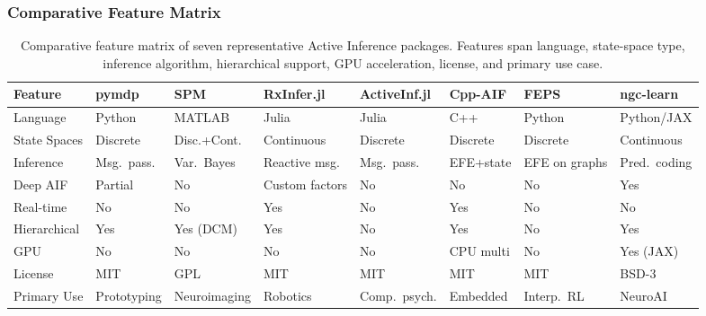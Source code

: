 \documentclass[
  english,
]{article}
\begin{document}
{{{{{{{{{{{{{{{{\FloatBarrier

\subsubsection{Comparative Feature
Matrix}\label{comparative-feature-matrix}

\begin{table}[H]
\centering
\caption{Comparative feature matrix of seven representative Active Inference packages. Features span language, state-space type, inference algorithm, hierarchical support, GPU acceleration, license, and primary use case.}
\label{tab:aif_feature_matrix}
\small
\begin{tabular}{llllllll}
\toprule
\textbf{Feature} & \textbf{pymdp} & \textbf{SPM} & \textbf{RxInfer.jl} & \textbf{ActiveInf.jl} & \textbf{Cpp-AIF} & \textbf{FEPS} & \textbf{ngc-learn} \\
\midrule
Language & Python & MATLAB & Julia & Julia & C++ & Python & Python/JAX \\
State Spaces & Discrete & Disc.+Cont. & Continuous & Discrete & Discrete & Discrete & Continuous \\
Inference & Msg.\ pass. & Var.\ Bayes & Reactive msg. & Msg.\ pass. & EFE+state & EFE on graphs & Pred.\ coding \\
Deep AIF & Partial & No & Custom factors & No & No & No & Yes \\
Real-time & No & No & Yes & No & Yes & No & No \\
Hierarchical & Yes & Yes (DCM) & Yes & No & Yes & No & Yes \\
GPU & No & No & No & No & CPU multi & No & Yes (JAX) \\
License & MIT & GPL & MIT & MIT & MIT & MIT & BSD-3 \\
Primary Use & Prototyping & Neuroimaging & Robotics & Comp.\ psych. & Embedded & Interp.\ RL & NeuroAI \\
\bottomrule
\end{tabular}
\end{table}

}}}}}}}}}}}}}}}}
\end{document}
